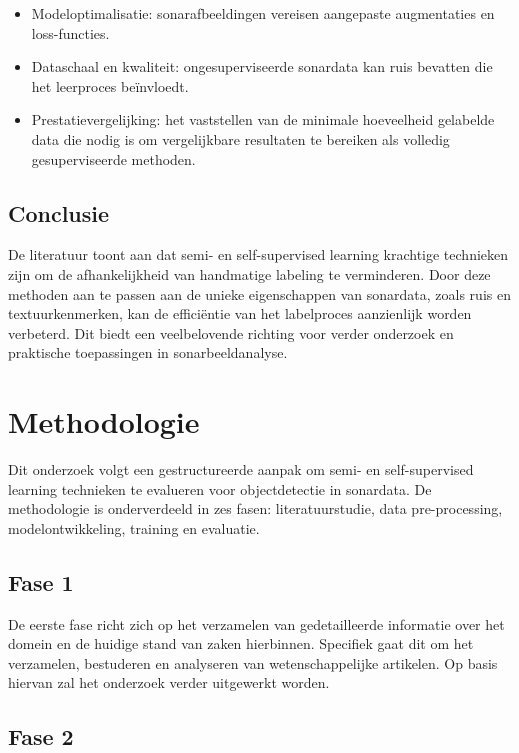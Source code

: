 \begin{itemize}
    \item Modeloptimalisatie: sonarafbeeldingen vereisen aangepaste augmentaties en loss-functies.
    \item Dataschaal en kwaliteit: ongesuperviseerde sonardata kan ruis bevatten die het leerproces beïnvloedt.
    \item Prestatievergelijking: het vaststellen van de minimale hoeveelheid gelabelde data die nodig is om vergelijkbare resultaten te bereiken als volledig gesuperviseerde methoden.
\end{itemize}

\subsection{Conclusie}

De literatuur toont aan dat semi- en self-supervised learning krachtige technieken zijn om de afhankelijkheid van handmatige labeling te verminderen. Door deze methoden aan te passen aan de unieke eigenschappen van sonardata, zoals ruis en textuurkenmerken, kan de efficiëntie van het labelproces aanzienlijk worden verbeterd. Dit biedt een veelbelovende richting voor verder onderzoek en praktische toepassingen in sonarbeeldanalyse.

\section{Methodologie}%
\label{sec:methodologie}

Dit onderzoek volgt een gestructureerde aanpak om semi- en self-supervised learning technieken te evalueren voor objectdetectie in sonardata. De methodologie is onderverdeeld in zes fasen: literatuurstudie, data pre-processing, modelontwikkeling, training en evaluatie.

\subsection{Fase 1}

De eerste fase richt zich op het verzamelen van gedetailleerde informatie over het domein en de huidige stand van zaken hierbinnen. Specifiek gaat dit om het verzamelen, bestuderen en analyseren van wetenschappelijke artikelen. Op basis hiervan zal het onderzoek verder uitgewerkt worden.

\subsection{Fase 2}

